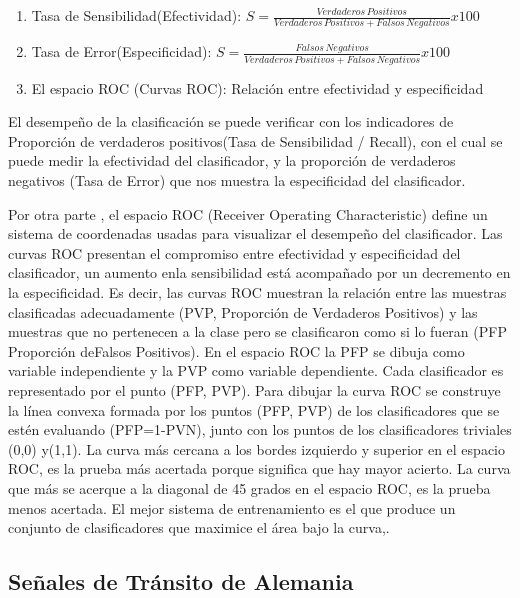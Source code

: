 		\begin{enumerate}
	
		\item Tasa de Sensibilidad(Efectividad): {$S= \frac{Verdaderos\,Positivos}{{Verdaderos\,Positivos}+{Falsos\,Negativos}}x100$}
		\item Tasa de Error(Especificidad): {$S= \frac{Falsos\,Negativos}{{Verdaderos\,Positivos}+{Falsos\,Negativos}}x100$}
		\item El espacio ROC (Curvas ROC): Relación entre efectividad y especificidad

		\end{enumerate}
		
		
		El desempeño de la clasificación se puede verificar con los indicadores de Proporción de verdaderos positivos(Tasa de Sensibilidad / Recall), con el cual se puede medir la efectividad del clasificador, y la proporción de verdaderos negativos (Tasa de Error) que nos muestra la especificidad del clasificador. 

		Por otra parte , el espacio ROC (Receiver Operating Characteristic) define un sistema de coordenadas usadas para visualizar el desempeño del clasificador. Las curvas ROC presentan el compromiso entre efectividad y especificidad del clasificador, un aumento enla sensibilidad está acompañado por un decremento en la especificidad. Es decir, las curvas ROC muestran la relación entre las muestras clasificadas adecuadamente (PVP, Proporción de Verdaderos Positivos) y las muestras que no pertenecen a la clase pero se clasificaron como si lo fueran (PFP Proporción deFalsos Positivos). En el espacio ROC la PFP se dibuja como variable independiente y la PVP como variable dependiente. Cada clasificador es representado por el punto (PFP, PVP). Para dibujar la curva ROC se construye la línea convexa formada por los puntos (PFP, PVP) de los clasificadores que se estén evaluando (PFP=1-PVN), junto con los puntos de los clasificadores triviales (0,0) y(1,1). La curva más cercana a los bordes izquierdo y superior en el espacio ROC, es la prueba más acertada porque significa que hay mayor acierto. La curva que más se acerque a la diagonal de 45 grados en el espacio ROC, es la prueba menos acertada. El mejor sistema de entrenamiento es el que produce un conjunto de clasificadores que maximice el área bajo la curva,\citep{SandovalCereza}.

		\newpage
	\subsection{Señales de Tránsito de Alemania}
